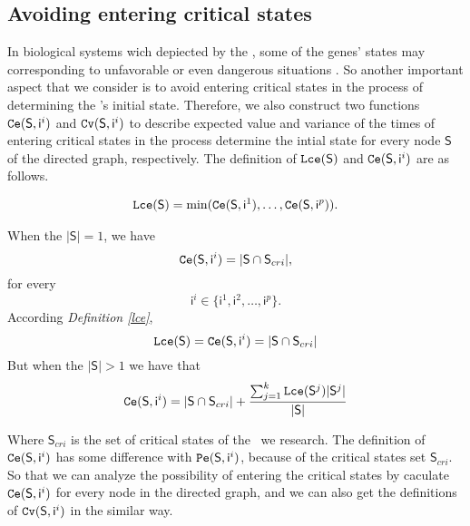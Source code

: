 \subsection{Avoiding entering critical states}
In biological systems wich depiected by the \BCNs, some of the genes' states may corresponding to unfavorable or even dangerous situations \cite{Li2014Controllability}. So another important aspect that we consider is to avoid entering critical states in the process of determining the \BCN's initial state. Therefore, we also construct two functions ${\tt Ce}(\mathsf{S}, \mathsf{ i}^{i})$ and ${\tt Cv}(\mathsf{S}, \mathsf{ i}^{i})$ to describe expected value and variance of the times of entering critical states in the process determine the intial state for every node $\mathsf{S}$ of the directed graph, respectively. The definition of ${\tt Lce}(\mathsf{S})$ and ${\tt Ce}(\mathsf{S}, \mathsf{ i}^{i})$ are as follows.\\
\begin{definition} \label{lce}
\begin{equation}
\begin{split}
{\tt Lce}(\mathsf{S})= \min({\tt Ce}(\mathsf{S}, \mathsf{ i}^{1}),\ldots,{\tt Ce}(\mathsf{S}, \mathsf{ i}^{p})).
\end{split}
\end{equation}
\end{definition}
\begin{definition} 
When the $|\mathsf{S}|=1$, we have \[{\tt Ce}(\mathsf{S}, \mathsf{ i}^{i})=|\mathsf{S} \cap \mathsf{S}_{cri} |,\]  for every \[\mathsf{ i}^{i} \in \{\mathsf{ i}^{1},\mathsf{ i}^{2},\ldots, \mathsf{ i}^{p}\}.\]  
According {\em Definition \ref{lce}}, 
\[{\tt Lce}(\mathsf{S})={\tt Ce}(\mathsf{S}, \mathsf{ i}^{i})=|\mathsf{S} \cap \mathsf{S}_{cri} |\] 
But when the $|\mathsf{S}|>1$ 
we have that 
\begin{equation}
\begin{split}
{\tt Ce}(\mathsf{S}, \mathsf{ i}^{i})=|\mathsf{S} \cap \mathsf{S}_{cri}| +\frac{\sum_{j=1}^k {\tt Lce}(\mathsf{S}^{j})|\mathsf{S}^{j}|}{ |\mathsf{S}|} 
\end{split}
\end{equation}
\end{definition}

Where $\mathsf{S}_{cri}$ is the set of critical states of the \BCN\ we research. The definition of ${\tt Ce}(\mathsf{S}, \mathsf{ i}^{i})$ has some difference with ${\tt Pe}(\mathsf{S}, \mathsf{ i}^{i})$, because of the critical states set $\mathsf{S}_{cri}$. So that we can analyze the possibility of entering the critical states by caculate ${\tt Ce}(\mathsf{S}, \mathsf{ i}^{i})$ for every node in the directed graph, and we can also get the definitions of ${\tt Cv}(\mathsf{S}, \mathsf{ i}^{i})$ in the similar way.

